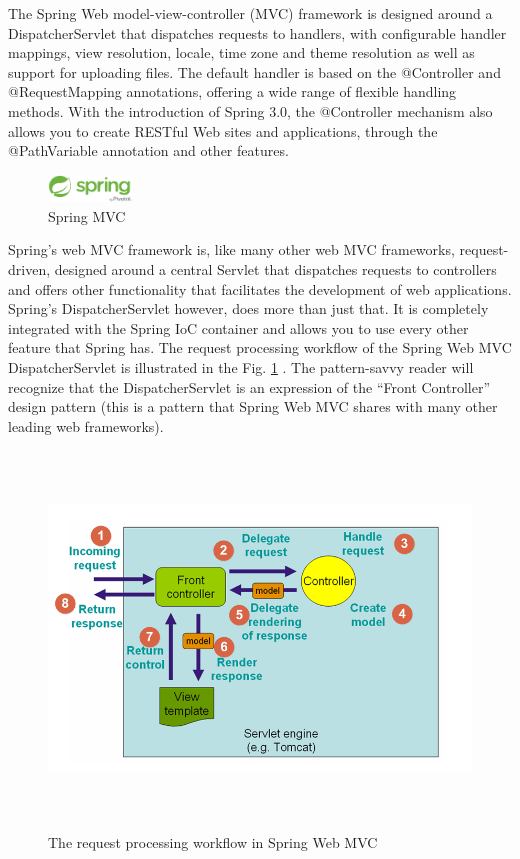 The Spring Web model-view-controller (MVC) framework is designed around a \colorbox{mygray}{DispatcherServlet} that dispatches requests to handlers, with configurable handler mappings, view resolution, locale, time zone and theme resolution as well as support for uploading files. The default handler is based on the \colorbox{mygray}{@Controller} and \colorbox{mygray}{@RequestMapping} annotations, offering a wide range of flexible handling methods. With the introduction of Spring 3.0, the \colorbox{mygray}{@Controller} mechanism also allows you to create RESTful Web sites and applications, through the \colorbox{mygray}{@PathVariable} annotation and other features.
\begin{figure}[!b]
	\centering
	\includegraphics[width=0.2\textwidth]{Spring_logo.png}
	\caption{Spring MVC}
\end{figure}
Spring’s web MVC framework is, like many other web MVC frameworks, request-driven, designed around a central Servlet that dispatches requests to controllers and offers other functionality that facilitates the development of web applications. Spring’s DispatcherServlet however, does more than just that. It is completely integrated with the Spring IoC container and allows you to use every other feature that Spring has. The request processing workflow of the Spring Web MVC DispatcherServlet is illustrated in the Fig. \ref{WorkflowSpringMVC} . The pattern-savvy reader will recognize that the DispatcherServlet is an expression of the ``Front Controller'' design pattern (this is a pattern that Spring Web MVC shares with many other leading web frameworks).
\begin{figure}[!h]
	\centering
	\includegraphics[width=15.5cm,height=10cm]{workflow_spring_mvc.png}
	\caption[The request processing workflow in Spring Web MVC]{The request processing workflow in Spring Web MVC \cite{ref10}}
	\label{WorkflowSpringMVC}
\end{figure}



